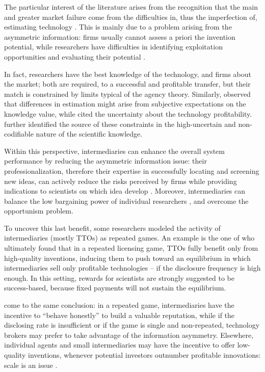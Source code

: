 The particular interest of the literature arises from the recognition that the main and greater market failure come from the difficulties in, thus the imperfection of, estimating technology \citep{Hoppe2005}. This is mainly due to a problem arising from the asymmetric information: firms usually cannot assess a priori the invention potential, while researchers have difficulties in identifying exploitation opportunities and evaluating their potential \citep{Debackere2005}. 

In fact, researchers have the best knowledge of the technology, and firms about the market; both are required, to a successful and profitable transfer, but their match is constrained by limits typical of the agency theory. Similarly, \citet{Bercovitz2006} observed that differences in estimation might arise from subjective expectations on the knowledge value, while \citet{Hoppe2005} cited the uncertainty about the technology profitability. \citet{Debackere2005} further identified the source of these constraints in the high-uncertain and non-codifiable nature of the scientific knowledge.

Within this perspective, intermediaries can enhance the overall system performance by reducing the asymmetric information issue: their professionalization, therefore their expertise in successfully locating and screening new ideas, can actively reduce the risks perceived by firms while providing indications to scientists on which idea develop \citep{Debackere2005}. Moreover, intermediaries can balance the low bargaining power of individual researchers \citep{Bercovitz2006}, and overcome the opportunism problem.

To uncover this last benefit, some researchers modeled the activity of intermediaries (mostly TTOs) as repeated games. An example is the one of \citet{Hoppe2005} who ultimately found that in a repeated licensing game, TTOs fully benefit only from high-quality inventions, inducing them to push toward an equilibrium in which intermediaries sell only profitable technologies – if the disclosure frequency is high enough. In this setting, rewards for scientists are strongly suggested to be success-based, because fixed payments will not sustain the equilibrium. 

\citet{Macho-Stadler2007} come to the same conclusion: in a repeated game, intermediaries have the incentive to \enquote{behave honestly} to build a valuable reputation, while if the disclosing rate is insufficient or if the game is single and non-repeated, technology brokers may prefer to take advantage of the information asymmetry. Elsewhere, individual agents and small intermediaries may have the incentive to offer low-quality inventions, whenever potential investors outnumber profitable innovations: scale is an issue \citep{Hoppe2005, Macho-Stadler2007}. 


